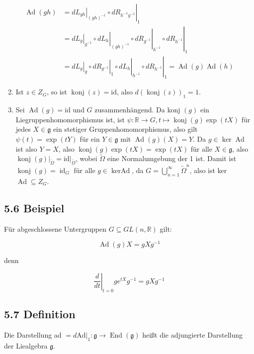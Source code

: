 \documentclass[10pt, letterpaper]{article}
\begin{document}
$$
\begin{aligned}
\operatorname{Ad}(g h) & =\left.\left.d L_{g h}\right|_{(g h)^{-1}} \circ d R_{h^{-1} g^{-1}}\right|_{1} \\
& =\left.\left.\left.\left.d L_{g}\right|_{g^{-1}} \circ d L_{h}\right|_{(g h)^{-1}} \circ d R_{g^{-1}}\right|_{h^{-1}} \circ d R_{h^{-1}}\right|_{1} \\
& =\left.\left.\left.\left.d L_{g}\right|_{g} \circ d R_{g^{-1}}\right|_{1} \circ d L_{h}\right|_{h^{-1}} \circ d R_{h^{-1}}\right|_{1}=\operatorname{Ad}(g) \operatorname{Ad}(h)
\end{aligned}
$$

\begin{enumerate}
  \setcounter{enumi}{1}
  \item Ist $z \in Z_{G}$, so ist $\operatorname{konj}(z)=\mathrm{id}$, also $d(\operatorname{konj}(z))_{1}=1$.
  \item Sei $\operatorname{Ad}(g)=\mathrm{id}$ und $G$ zusammenhängend. Da konj $(g)$ ein Liegruppenhomomorphismus ist, ist $\psi: \mathbb{R} \rightarrow G, t \mapsto \operatorname{konj}(g) \exp (t X)$ für jedes $X \in \mathfrak{g}$ ein stetiger Gruppenhomomorphismus, also gilt $\psi(t)=\exp (t Y)$ für ein $Y \in \mathfrak{g}$ mit $\operatorname{Ad}(g)(X)=Y$. Da $g \in \operatorname{ker} \operatorname{Ad}$ ist also $Y=X$, also $\operatorname{konj}(g) \exp (t X)=\exp (t X)$ für alle $X \in \mathfrak{g}$, also $\left.\operatorname{konj}(g)\right|_{\tilde{\Omega}}=\left.\mathrm{id}\right|_{\tilde{\Omega}}$, wobei $\tilde{\Omega}$ eine Normalumgebung der 1 ist. Damit ist $\operatorname{konj}(g)=\operatorname{id}_{G}$ für alle $g \in \operatorname{kerAd}$, da $G=\bigcup_{n=1}^{\infty} \tilde{\Omega}^{n}$, also ist ker $\operatorname{Ad} \subseteq Z_{G}$.
\end{enumerate}

\subsection*{5.6 Beispiel}
Für abgeschlossene Untergruppen $G \subseteq G L(n, \mathbb{R})$ gilt:

$$
\operatorname{Ad}(g) X=g X g^{-1}
$$

denn

$$
\left.\frac{d}{d t}\right|_{t=0} g e^{t X} g^{-1}=g X g^{-1}
$$

\subsection*{5.7 Definition}
Die Darstellung ad $=\left.d \mathrm{Ad}\right|_{1}: \mathfrak{g} \rightarrow \operatorname{End}(\mathfrak{g})$ heißt die adjungierte Darstellung der Liealgebra $\mathfrak{g}$.
\end{document}
